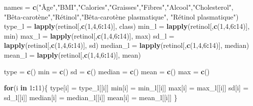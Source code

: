 \documentclass[]{article}
\newenvironment{Shaded}{\begin{snugshade}}{\end{snugshade}}
\newcommand{\KeywordTok}[1]{\textcolor[rgb]{0.13,0.29,0.53}{\textbf{#1}}}
\newcommand{\DecValTok}[1]{\textcolor[rgb]{0.00,0.00,0.81}{#1}}
\newcommand{\StringTok}[1]{\textcolor[rgb]{0.31,0.60,0.02}{#1}}
\newcommand{\ControlFlowTok}[1]{\textcolor[rgb]{0.13,0.29,0.53}{\textbf{#1}}}
\newcommand{\OperatorTok}[1]{\textcolor[rgb]{0.81,0.36,0.00}{\textbf{#1}}}
\newcommand{\NormalTok}[1]{#1}
\begin{document}
\begin{Shaded}
\begin{Highlighting}[]
\NormalTok{names =}\StringTok{ }\KeywordTok{c}\NormalTok{(}\StringTok{"Âge"}\NormalTok{,}\StringTok{"BMI"}\NormalTok{,}\StringTok{"Calories"}\NormalTok{,}\StringTok{"Graisses"}\NormalTok{,}\StringTok{"Fibres"}\NormalTok{,}\StringTok{"Alcool"}\NormalTok{,}\StringTok{"Cholesterol"}\NormalTok{,}
            \StringTok{"Bêta-carotène"}\NormalTok{,}\StringTok{"Rétinol"}\NormalTok{,}\StringTok{"Bêta-carotène plasmatique"}\NormalTok{, }\StringTok{"Rétinol plasmatique"}\NormalTok{)}
\NormalTok{type_l =}\StringTok{ }\KeywordTok{lapply}\NormalTok{(retinol[,}\KeywordTok{c}\NormalTok{(}\DecValTok{1}\NormalTok{,}\DecValTok{4}\NormalTok{,}\DecValTok{6}\OperatorTok{:}\DecValTok{14}\NormalTok{)], class)}
\NormalTok{min_l =}\StringTok{ }\KeywordTok{lapply}\NormalTok{(retinol[,}\KeywordTok{c}\NormalTok{(}\DecValTok{1}\NormalTok{,}\DecValTok{4}\NormalTok{,}\DecValTok{6}\OperatorTok{:}\DecValTok{14}\NormalTok{)], min)}
\NormalTok{max_l =}\StringTok{ }\KeywordTok{lapply}\NormalTok{(retinol[,}\KeywordTok{c}\NormalTok{(}\DecValTok{1}\NormalTok{,}\DecValTok{4}\NormalTok{,}\DecValTok{6}\OperatorTok{:}\DecValTok{14}\NormalTok{)], max)}
\NormalTok{sd_l =}\StringTok{ }\KeywordTok{lapply}\NormalTok{(retinol[,}\KeywordTok{c}\NormalTok{(}\DecValTok{1}\NormalTok{,}\DecValTok{4}\NormalTok{,}\DecValTok{6}\OperatorTok{:}\DecValTok{14}\NormalTok{)], sd)}
\NormalTok{median_l =}\StringTok{ }\KeywordTok{lapply}\NormalTok{(retinol[,}\KeywordTok{c}\NormalTok{(}\DecValTok{1}\NormalTok{,}\DecValTok{4}\NormalTok{,}\DecValTok{6}\OperatorTok{:}\DecValTok{14}\NormalTok{)], median)}
\NormalTok{mean_l =}\StringTok{ }\KeywordTok{lapply}\NormalTok{(retinol[,}\KeywordTok{c}\NormalTok{(}\DecValTok{1}\NormalTok{,}\DecValTok{4}\NormalTok{,}\DecValTok{6}\OperatorTok{:}\DecValTok{14}\NormalTok{)], mean)}

\NormalTok{type =}\StringTok{ }\KeywordTok{c}\NormalTok{()}
\NormalTok{min =}\StringTok{ }\KeywordTok{c}\NormalTok{()}
\NormalTok{sd =}\StringTok{ }\KeywordTok{c}\NormalTok{()}
\NormalTok{median =}\StringTok{ }\KeywordTok{c}\NormalTok{()}
\NormalTok{mean =}\StringTok{ }\KeywordTok{c}\NormalTok{()}
\NormalTok{max =}\StringTok{ }\KeywordTok{c}\NormalTok{()}

\ControlFlowTok{for}\NormalTok{(i }\ControlFlowTok{in} \DecValTok{1}\OperatorTok{:}\DecValTok{11}\NormalTok{)\{}
\NormalTok{  type[i] =}\StringTok{ }\NormalTok{type_l[[i]]}
\NormalTok{  min[i] =}\StringTok{ }\NormalTok{min_l[[i]]}
\NormalTok{  max[i] =}\StringTok{ }\NormalTok{max_l[[i]]}
\NormalTok{  sd[i] =}\StringTok{ }\NormalTok{sd_l[[i]]}
\NormalTok{  median[i] =}\StringTok{ }\NormalTok{median_l[[i]]}
\NormalTok{  mean[i] =}\StringTok{ }\NormalTok{mean_l[[i]]}
\NormalTok{\}}


\end{Highlighting}
\end{Shaded}
\end{document}
